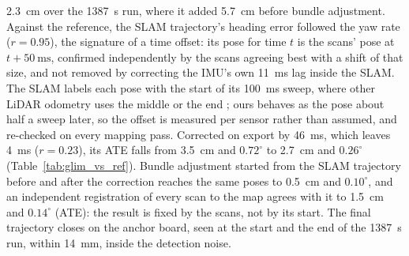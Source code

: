 \SI{2.3}{\centi\metre} over the \SI{1387}{\second} run, where it added
\SI{5.7}{\centi\metre} before bundle adjustment. Against the reference, the SLAM
trajectory's heading error followed the yaw rate ($r=0.95$), the signature
of a time offset: its pose for time $t$ is the scans' pose at
$t+\SI{50}{\milli\second}$, confirmed independently by the scans agreeing
best with a shift of that size, and not removed by correcting the IMU's own
\SI{11}{\milli\second} lag inside the SLAM. The SLAM labels each pose
with the start of its \SI{100}{\milli\second} sweep, where other LiDAR
odometry uses the middle or the end \cite{molaglim}; ours behaves as the
pose about half a sweep later, so the offset is measured per sensor rather
than assumed, and re-checked on every mapping pass. Corrected on export by
\SI{46}{\milli\second}, which leaves \SI{4}{\milli\second} ($r=0.23$), its
ATE falls from \SI{3.5}{\centi\metre} and $0.72^\circ$ to
\SI{2.7}{\centi\metre} and $0.26^\circ$ (Table~\ref{tab:glim_vs_ref}).
Bundle adjustment started from the SLAM trajectory before and after the
correction reaches the same poses to \SI{0.5}{\centi\metre} and
$0.10^\circ$, and an independent registration of every scan to the map
agrees with it to \SI{1.5}{\centi\metre} and $0.14^\circ$ (ATE): the
result is fixed by the scans, not by its start. The final trajectory closes on the anchor board, seen at
the start and the end of the \SI{1387}{\second} run, within
\SI{14}{\milli\metre}, inside the detection noise.

